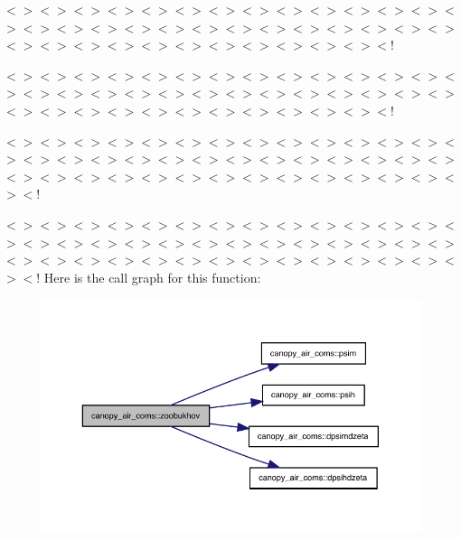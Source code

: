 $<$$>$$<$$>$$<$$>$$<$$>$$<$$>$$<$$>$$<$$>$$<$$>$$<$$>$$<$$>$$<$$>$$<$$>$$<$$>$$<$$>$$<$$>$$<$$>$$<$$>$$<$$>$$<$$>$$<$$>$$<$$>$$<$$>$$<$$>$$<$$>$$<$$>$$<$$>$$<$$>$$<$$>$$<$$>$$<$$>$$<$$>$$<$$>$$<$$>$$<$$>$$<$$>$$<$$>$$<$$>$$<$$>$$<$!

$<$$>$$<$$>$$<$$>$$<$$>$$<$$>$$<$$>$$<$$>$$<$$>$$<$$>$$<$$>$$<$$>$$<$$>$$<$$>$$<$$>$$<$$>$$<$$>$$<$$>$$<$$>$$<$$>$$<$$>$$<$$>$$<$$>$$<$$>$$<$$>$$<$$>$$<$$>$$<$$>$$<$$>$$<$$>$$<$$>$$<$$>$$<$$>$$<$$>$$<$$>$$<$$>$$<$$>$$<$$>$$<$$>$$<$!

$<$$>$$<$$>$$<$$>$$<$$>$$<$$>$$<$$>$$<$$>$$<$$>$$<$$>$$<$$>$$<$$>$$<$$>$$<$$>$$<$$>$$<$$>$$<$$>$$<$$>$$<$$>$$<$$>$$<$$>$$<$$>$$<$$>$$<$$>$$<$$>$$<$$>$$<$$>$$<$$>$$<$$>$$<$$>$$<$$>$$<$$>$$<$$>$$<$$>$$<$$>$$<$$>$$<$$>$$<$$>$$<$$>$$<$$>$$<$$>$$<$$>$$<$!

$<$$>$$<$$>$$<$$>$$<$$>$$<$$>$$<$$>$$<$$>$$<$$>$$<$$>$$<$$>$$<$$>$$<$$>$$<$$>$$<$$>$$<$$>$$<$$>$$<$$>$$<$$>$$<$$>$$<$$>$$<$$>$$<$$>$$<$$>$$<$$>$$<$$>$$<$$>$$<$$>$$<$$>$$<$$>$$<$$>$$<$$>$$<$$>$$<$$>$$<$$>$$<$$>$$<$$>$$<$$>$$<$$>$$<$$>$$<$$>$$<$$>$$<$! Here is the call graph for this function\+:
\nopagebreak
\begin{figure}[H]
\begin{center}
\leavevmode
\includegraphics[width=350pt]{namespacecanopy__air__coms_a6062471b3381c283205ea8b27383a5e0_cgraph}
\end{center}
\end{figure}
\mbox{\label{namespacecanopy__air__coms_afef697305b4b30385c5206f48d9e787c}} 
